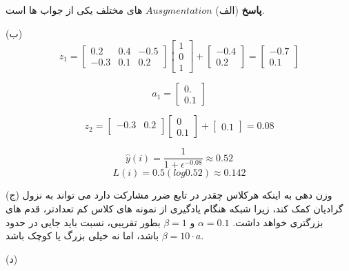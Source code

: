 \textbf{پاسخ}
(الف) $Ausgmentation$ های مختلف یکی از جواب ها است.

(ب)
\begin{equation}
z_1 = \begin{bmatrix}
0.2&0.4&-0.5 \\
-0.3&0.1&0.2
\end{bmatrix} 
\begin{bmatrix}
1 \\
0 \\
1
\end{bmatrix} + \begin{bmatrix}
-0.4\\
0.2
\end{bmatrix} = \begin{bmatrix}
-0.7\\
0.1
\end{bmatrix}
\end{equation}

\begin{equation}
a_1=\begin{bmatrix}
0.\\
0.1
\end{bmatrix}
\end{equation}

\begin{equation}
z_2 = \begin{bmatrix}
-0.3&0.2 \\
\end{bmatrix} 
\begin{bmatrix}
0 \\
0.1
\end{bmatrix} + \begin{bmatrix}
0.1
\end{bmatrix} = 0.08
\end{equation}

\begin{equation}
    \hat{y}(i) = \frac{1}{1+\epsilon^{-0.08}}\approx 0.52
\end{equation}
\begin{equation}
    L(i) = 0.5(log0.52) \approx 0.142
\end{equation}

(ج) وزن دهی به اینکه هرکلاس چقدر در تابع ضرر مشارکت دارد می تواند به نزول گرادیان کمک کند، زیرا شبکه هنگام یادگیری از نمونه های کلاس کم تعدادتر، قدم های بزرگتری خواهد داشت.
$\alpha = 0.1$ و $\beta = 1$ بطور تقریبی، نسبت باید جایی در حدود $\beta =10 \cdot a $ باشد، اما نه خیلی بزرگ یا کوچک باشد.

(د) 

